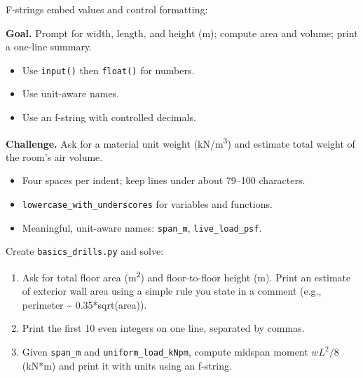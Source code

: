 
F-strings embed values and control formatting:


\textbf{Goal.} Prompt for width, length, and height (m); compute area and volume; print a one-line summary.
\begin{itemize}
  \item Use \texttt{input()} then \texttt{float()} for numbers.
  \item Use unit-aware names.
  \item Use an f-string with controlled decimals.
\end{itemize}


\textbf{Challenge.} Ask for a material unit weight (kN/m\textsuperscript{3}) and estimate total weight of the room's air volume.

\begin{itemize}
  \item Four spaces per indent; keep lines under about 79--100 characters.
  \item \texttt{lowercase\_with\_underscores} for variables and functions.
  \item Meaningful, unit-aware names: \texttt{span\_m}, \texttt{live\_load\_psf}.
\end{itemize}

Create \texttt{basics\_drills.py} and solve:
\begin{enumerate}
  \item Ask for total floor area (m\textsuperscript{2}) and floor-to-floor height (m). Print an estimate of exterior wall area using a simple rule you state in a comment (e.g., perimeter \textasciitilde{} 0.35*sqrt(area)).
  \item Print the first 10 even integers on one line, separated by commas.
  \item Given \texttt{span\_m} and \texttt{uniform\_load\_kNpm}, compute midspan moment \(wL^2/8\) (kN*m) and print it with units using an f-string.
\end{enumerate}
